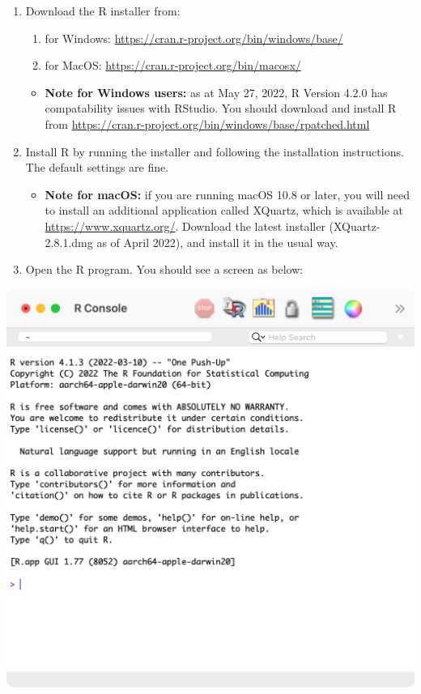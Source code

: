 \documentclass[
]{memoir}
\providecommand{\tightlist}{%
  \setlength{\itemsep}{0pt}\setlength{\parskip}{0pt}}
\begin{document}
\begin{enumerate}
\def\labelenumi{\arabic{enumi}.}
\item
  Download the R installer from:

  \begin{enumerate}
  \def\labelenumii{\alph{enumii}.}
  \tightlist
  \item
    for Windows: \url{https://cran.r-project.org/bin/windows/base/}
  \item
    for MacOS: \url{https://cran.r-project.org/bin/macosx/}
  \end{enumerate}

  \begin{itemize}
  \tightlist
  \item
    \textbf{Note for Windows users:} as at May 27, 2022, R Version 4.2.0 has compatability issues with RStudio. You should download and install R from \url{https://cran.r-project.org/bin/windows/base/rpatched.html}
  \end{itemize}
\item
  Install R by running the installer and following the installation instructions. The default settings are fine.

  \begin{itemize}
  \tightlist
  \item
    \textbf{Note for macOS:} if you are running macOS 10.8 or later, you will need to install an additional application called XQuartz, which is available at \url{https://www.xquartz.org/}. Download the latest installer (XQuartz-2.8.1.dmg as of April 2022), and install it in the usual way.
  \end{itemize}
\item
  Open the R program. You should see a screen as below:
\end{enumerate}

\includegraphics[width=0.8\linewidth]{img/R-screenshot}
\end{document}
